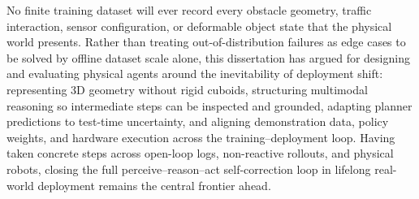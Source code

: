 \medskip\label{sec:concl:closing}
\noindent No finite training dataset will ever record every obstacle geometry, traffic interaction, sensor configuration, or deformable object state that the physical world presents. Rather than treating out-of-distribution failures as edge cases to be solved by offline dataset scale alone, this dissertation has argued for designing and evaluating physical agents around the inevitability of deployment shift: representing 3D geometry without rigid cuboids, structuring multimodal reasoning so intermediate steps can be inspected and grounded, adapting planner predictions to test-time uncertainty, and aligning demonstration data, policy weights, and hardware execution across the training--deployment loop. Having taken concrete steps across open-loop logs, non-reactive rollouts, and physical robots, closing the full perceive--reason--act self-correction loop in lifelong real-world deployment remains the central frontier ahead.
